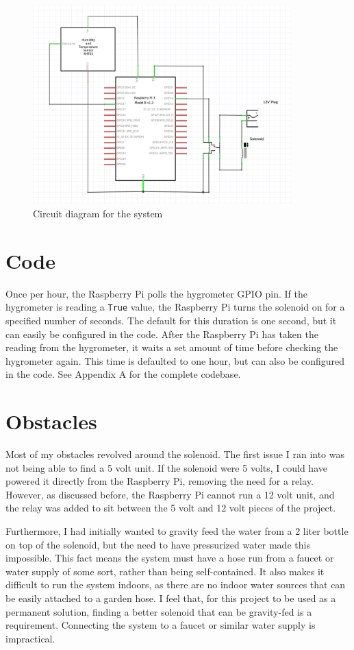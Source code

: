 \documentclass[11pt] {article}
\begin{document}
\begin{figure}[H]
    \begin{centering}
        \includegraphics[width=10cm]{../img/circuit}
        \caption{Circuit diagram for the system}
    \end{centering}
\end{figure}

\section{Code}
Once per hour, the Raspberry Pi polls the hygrometer GPIO pin. If the hygrometer is reading a \texttt{True} value, the
Raspberry Pi turns the solenoid on for a specified number of seconds. The default for this duration is one second, but
it can easily be configured in the code. After the Raspberry Pi has taken the reading from the hygrometer, it waits
a set amount of time before checking the hygrometer again. This time is defaulted to one hour, but can also
be configured in the code. See Appendix A for the complete codebase.

\section{Obstacles}
Most of my obstacles revolved around the solenoid. The first issue I ran into was not being able to find a 5 volt unit.
If the solenoid were 5 volts, I could have powered it directly from the Raspberry Pi, removing the need for a relay.
However, as discussed before, the Raspberry Pi cannot run a 12 volt unit, and the relay was added to sit between the
5 volt and 12 volt pieces of the project.

Furthermore, I had initially wanted to gravity feed the water from a 2 liter bottle on top of the solenoid, but the
need to have pressurized water made this impossible. This fact means the system must have a hose run from a faucet or
water supply of some sort, rather than being self-contained. It also makes it difficult to run the system indoors, as
there are no indoor water sources that can be easily attached to a garden hose. I feel that, for this project to be
used as a permanent solution, finding a better solenoid that can be gravity-fed is a requirement. Connecting the system
to a faucet or similar water supply is impractical.
\end{document}
